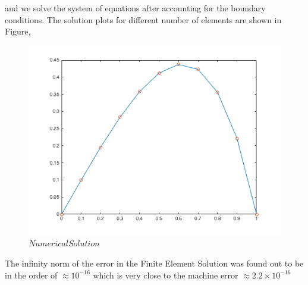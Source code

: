 \begin{example}
		 and we solve the system of equations after accounting for the boundary conditions.	The solution plots for different number of elements are shown in Figure,\\
		 
		 \begin{figure}[h!]
		 		\includegraphics[scale = 0.8]{images/firstex.png}
		 		\caption{$Numerical Solution$}
		 \end{figure}
		 
		The infinity norm of the error in the Finite Element Solution was found out to be in the order of $\approx 10^{-16}$ which is very close to the machine error $\approx 2.2 \times 10^{-16}$
		

\end{example}

